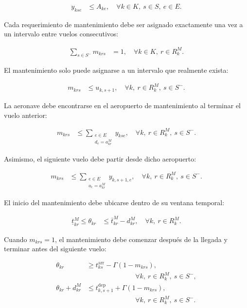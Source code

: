 \begin{align}
y_{kse}
&\leq
A_{ke},
\quad
\forall k\in K,\ s\in S,\ e\in E.
\tag{R12}
\label{eq:r12}
\end{align}

Cada requerimiento de mantenimiento debe ser asignado exactamente una vez a un intervalo
entre vuelos consecutivos:

\begin{align}
\sum_{s\in S^-}m_{krs}
&=
1,
\quad
\forall k\in K,\ r\in R_k^M.
\tag{R13a}
\label{eq:r13a}
\end{align}

El mantenimiento solo puede asignarse a un intervalo que realmente exista:

\begin{align}
m_{krs}
&\leq
u_{k,s+1},
\quad
\forall k,\ r\in R_k^M,\ s\in S^-.
\tag{R13b}
\label{eq:r13b}
\end{align}

La aeronave debe encontrarse en el aeropuerto de mantenimiento al terminar el vuelo anterior:

\begin{align}
m_{krs}
&\leq
\sum_{\substack{e\in E\\d_e=a_{kr}^{M}}}
y_{kse},
\quad
\forall k,\ r\in R_k^M,\ s\in S^-.
\tag{R13c}
\label{eq:r13c}
\end{align}

Asimismo, el siguiente vuelo debe partir desde dicho aeropuerto:

\begin{align}
m_{krs}
&\leq
\sum_{\substack{e\in E\\o_e=a_{kr}^{M}}}
y_{k,s+1,e},
\quad
\forall k,\ r\in R_k^M,\ s\in S^-.
\tag{R13d}
\label{eq:r13d}
\end{align}

El inicio del mantenimiento debe ubicarse dentro de su ventana temporal:

\begin{align}
\underline{t}_{kr}^{M}
\leq
\theta_{kr}
&\leq
\overline{t}_{kr}^{M}-d_{kr}^{M},
\quad
\forall k,\ r\in R_k^M.
\tag{R13e}
\label{eq:r13e}
\end{align}

Cuando $m_{krs}=1$, el mantenimiento debe comenzar después de la llegada y terminar antes del
siguiente vuelo:

\begin{align}
\theta_{kr}
&\geq
t_{ks}^{\mathrm{arr}}
-
\Gamma(1-m_{krs}),
\nonumber\\[-1mm]
&\hspace{3cm}
\forall k,\ r\in R_k^M,\ s\in S^-,
\tag{R13f}
\label{eq:r13f}
\\
\theta_{kr}+d_{kr}^{M}
&\leq
t_{k,s+1}^{\mathrm{dep}}
+
\Gamma(1-m_{krs}),
\nonumber\\[-1mm]
&\hspace{3cm}
\forall k,\ r\in R_k^M,\ s\in S^-.
\tag{R13g}
\label{eq:r13g}
\end{align}

